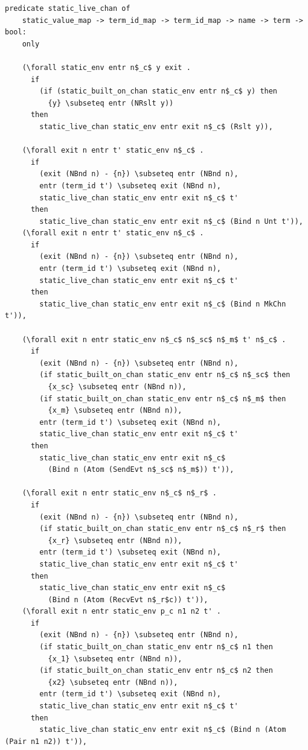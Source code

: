 \documentclass[10pt]{article}
\begin{document}
\begin{lstlisting}[language=logic, mathescape]
  predicate static_live_chan of
    static_value_map -> term_id_map -> term_id_map -> name -> term -> bool:
    only

    (\forall static_env entr n$_c$ y exit .
      if
        (if (static_built_on_chan static_env entr n$_c$ y) then
          {y} \subseteq entr (NRslt y))
      then
        static_live_chan static_env entr exit n$_c$ (Rslt y)),

    (\forall exit n entr t' static_env n$_c$ .
      if 
        (exit (NBnd n) - {n}) \subseteq entr (NBnd n),
        entr (term_id t') \subseteq exit (NBnd n),
        static_live_chan static_env entr exit n$_c$ t'
      then 
        static_live_chan static_env entr exit n$_c$ (Bind n Unt t')),
    (\forall exit n entr t' static_env n$_c$ .
      if
        (exit (NBnd n) - {n}) \subseteq entr (NBnd n),
        entr (term_id t') \subseteq exit (NBnd n),
        static_live_chan static_env entr exit n$_c$ t'
      then 
        static_live_chan static_env entr exit n$_c$ (Bind n MkChn t')),

    (\forall exit n entr static_env n$_c$ n$_sc$ n$_m$ t' n$_c$ .
      if
        (exit (NBnd n) - {n}) \subseteq entr (NBnd n),
        (if static_built_on_chan static_env entr n$_c$ n$_sc$ then
          {x_sc} \subseteq entr (NBnd n)),
        (if static_built_on_chan static_env entr n$_c$ n$_m$ then 
          {x_m} \subseteq entr (NBnd n)),
        entr (term_id t') \subseteq exit (NBnd n),
        static_live_chan static_env entr exit n$_c$ t'
      then
        static_live_chan static_env entr exit n$_c$
          (Bind n (Atom (SendEvt n$_sc$ n$_m$)) t')),

    (\forall exit n entr static_env n$_c$ n$_r$ .    
      if
        (exit (NBnd n) - {n}) \subseteq entr (NBnd n),
        (if static_built_on_chan static_env entr n$_c$ n$_r$ then
          {x_r} \subseteq entr (NBnd n)),
        entr (term_id t') \subseteq exit (NBnd n),
        static_live_chan static_env entr exit n$_c$ t'
      then
        static_live_chan static_env entr exit n$_c$
          (Bind n (Atom (RecvEvt n$_r$c)) t')),
    (\forall exit n entr static_env p_c n1 n2 t' .
      if
        (exit (NBnd n) - {n}) \subseteq entr (NBnd n),
        (if static_built_on_chan static_env entr n$_c$ n1 then
          {x_1} \subseteq entr (NBnd n)),
        (if static_built_on_chan static_env entr n$_c$ n2 then
          {x2} \subseteq entr (NBnd n)),
        entr (term_id t') \subseteq exit (NBnd n),
        static_live_chan static_env entr exit n$_c$ t'
      then
        static_live_chan static_env entr exit n$_c$ (Bind n (Atom (Pair n1 n2)) t')),


\end{lstlisting}
\end{document}
